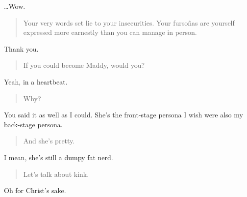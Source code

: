 \ldots{}Wow.

\begin{quote}
Your very words set lie to your insecurities. Your fursoñas are yourself expressed more earnestly than you can manage in person.
\end{quote}

Thank you.

\begin{quote}
If you could become Maddy, would you?
\end{quote}

Yeah, in a heartbeat.

\begin{quote}
Why?
\end{quote}

You said it as well as I could. She's the front-stage persona I wish were also my back-stage persona.

\begin{quote}
And she's pretty.
\end{quote}

I mean, she's still a dumpy fat nerd.

\begin{quote}
Let's talk about kink.
\end{quote}

Oh for Christ's sake.
